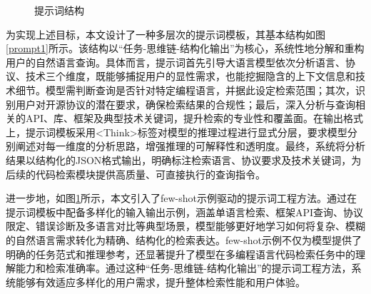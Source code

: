 \documentclass[UTF8,a4paper,12pt]{ctexart}
\numberwithin{equation}{section}
\begin{document}
\begin{figure}[H]
	\caption{提示词结构}
	\label{prompt2}
\end{figure}
为实现上述目标，本文设计了一种多层次的提示词模板，其基本结构如图\ref{prompt1}所示。该结构以“任务-思维链-结构化输出”为核心，系统性地分解和重构用户的自然语言查询。具体而言，提示词首先引导大语言模型依次分析语言、协议、技术三个维度，既能够捕捉用户的显性需求，也能挖掘隐含的上下文信息和技术细节。模型需判断查询是否针对特定编程语言，并据此设定检索范围；其次，识别用户对开源协议的潜在要求，确保检索结果的合规性；最后，深入分析与查询相关的API、库、框架及典型技术关键词，提升检索的专业性和覆盖面。在输出格式上，提示词模板采用<Think>标签对模型的推理过程进行显式分层，要求模型分别阐述对每一维度的分析思路，增强推理的可解释性和透明度。最终，系统将分析结果以结构化的JSON格式输出，明确标注检索语言、协议要求及技术关键词，为后续的代码检索模块提供高质量、可直接执行的查询指令。\par
进一步地，如图\ref{prompt2}所示，本文引入了few-shot示例驱动的提示词工程方法。通过在提示词模板中配备多样化的输入输出示例，涵盖单语言检索、框架API查询、协议限定、错误诊断及多语言对比等典型场景，模型能够更好地学习如何将复杂、模糊的自然语言需求转化为精确、结构化的检索表达。few-shot示例不仅为模型提供了明确的任务范式和推理参考，还显著提升了模型在多编程语言代码检索任务中的理解能力和检索准确率。通过这种“任务-思维链-结构化输出”的提示词工程方法，系统能够有效适应多样化的用户需求，提升整体检索性能和用户体验。
\end{document}
